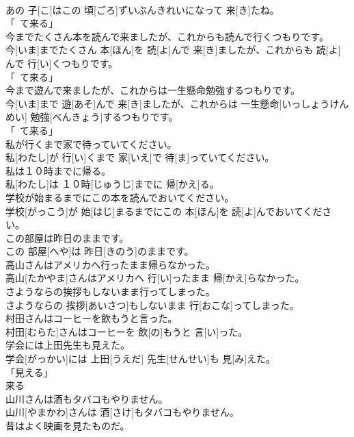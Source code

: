 \documentclass[8pt]{extreport}
\begin{document}
\begin{CJK}{UTF8}{min}
\\	あの 子[こ]はこの 頃[ごろ]ずいぶんきれいになって 来[き]たね。	
\\	「~て来る」
\\	今までたくさん本を読んで来ましたが、これからも読んで行くつもりです。	
\\	今[いま]までたくさん 本[ほん]を 読[よ]んで 来[き]ましたが、これからも 読[よ]んで 行[い]くつもりです。	
\\	「~て来る」
\\	今まで遊んで来ましたが、これからは一生懸命勉強するつもりです。	
\\	今[いま]まで 遊[あそ]んで 来[き]ましたが、これからは 一生懸命[いっしょうけんめい] 勉強[べんきょう]するつもりです。	
\\	「~て来る」
\\	私が行くまで家で待っていてください。	
\\	私[わたし]が 行[い]くまで 家[いえ]で 待[ま]っていてください。	
\\	私は１０時までに帰る。	
\\	私[わたし]は １０時[じゅうじ]までに 帰[かえ]る。	
\\	学校が始まるまでにこの本を読んでおいてください。	
\\	学校[がっこう]が 始[はじ]まるまでにこの 本[ほん]を 読[よ]んでおいてください。	
\\	この部屋は昨日のままです。	
\\	この 部屋[へや]は 昨日[きのう]のままです。	
\\	高山さんはアメリカへ行ったまま帰らなかった。	
\\	高山[たかやま]さんはアメリカへ 行[い]ったまま 帰[かえ]らなかった。	
\\	さようならの挨拶もしないまま行ってしまった。	
\\	さようならの 挨拶[あいさつ]もしないまま 行[おこな]ってしまった。	
\\	村田さんはコーヒーを飲もうと言った。	
\\	村田[むらた]さんはコーヒーを 飲[の]もうと 言[い]った。	
\\	学会には上田先生も見えた。	
\\	学会[がっかい]には 上田[うえだ] 先生[せんせい]も 見[み]えた。	
\\	「見える」
\\	来る
\\	山川さんは酒もタバコもやりません。	
\\	山川[やまかわ]さんは 酒[さけ]もタバコもやりません。	
\\	昔はよく映画を見たものだ。	

\end{CJK}
\end{document}
